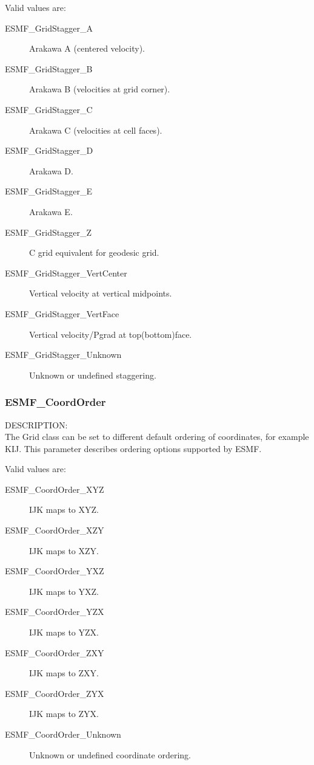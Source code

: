 Valid values are:
\begin{description}
   \item[ESMF\_GridStagger\_A] 
        Arakawa A (centered velocity).
   \item[ESMF\_GridStagger\_B] 
        Arakawa B (velocities at grid corner).
   \item[ESMF\_GridStagger\_C] 
        Arakawa C (velocities at cell faces).
   \item[ESMF\_GridStagger\_D] 
        Arakawa D.
   \item[ESMF\_GridStagger\_E] 
        Arakawa E.
   \item[ESMF\_GridStagger\_Z] 
        C grid equivalent for geodesic grid.
   \item[ESMF\_GridStagger\_VertCenter] 
        Vertical velocity at vertical midpoints.
   \item[ESMF\_GridStagger\_VertFace] 
        Vertical velocity/Pgrad at top(bottom)face.
   \item[ESMF\_GridStagger\_Unknown] 
        Unknown or undefined staggering.

\end{description}

\subsubsection{ESMF\_CoordOrder}

{\sf DESCRIPTION:\\}
The Grid class can be set to different default ordering of coordinates, for
example KIJ.  This parameter describes ordering options supported by ESMF.

Valid values are:
\begin{description}
   \item[ESMF\_CoordOrder\_XYZ] 
        IJK maps to XYZ.
   \item[ESMF\_CoordOrder\_XZY] 
        IJK maps to XZY.
   \item[ESMF\_CoordOrder\_YXZ] 
        IJK maps to YXZ.
   \item[ESMF\_CoordOrder\_YZX] 
        IJK maps to YZX.
   \item[ESMF\_CoordOrder\_ZXY] 
        IJK maps to ZXY.
   \item[ESMF\_CoordOrder\_ZYX] 
        IJK maps to ZYX.
   \item[ESMF\_CoordOrder\_Unknown] 
        Unknown or undefined coordinate ordering.
\end{description}

